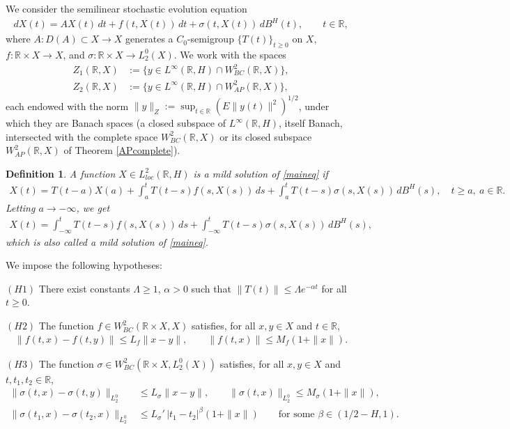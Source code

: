 \documentclass[11pt]{amsart}
\newtheorem{definition}[theorem]{Definition}
\begin{document}
We consider the semilinear stochastic evolution equation
\begin{align*}
dX(t)=AX(t)\,dt+f(t,X(t))\,dt+\sigma(t,X(t))\,dB^H(t),\qquad t\in\mathbb R,
\end{align*}
where $A:D(A)\subset X\to X$ generates a $C_0$-semigroup $\{T(t)\}_{t\ge0}$ on $X$, $f:\mathbb R\times X\to X$, and $\sigma:\mathbb R\times X\to L^0_2(X)$. We work with the spaces
\begin{align*}
Z_1(\mathbb R,X)& :=\{y\in L^\infty(\mathbb R,H)\cap W^2_{BC}(\mathbb R,X)\},\\
Z_2(\mathbb R,X)& :=\{y\in L^\infty(\mathbb R,H)\cap W^2_{AP}(\mathbb R,X)\},
\end{align*}
each endowed with the norm $\|y\|_Z:=\sup_{t\in\mathbb R}(E\|y(t)\|^2)^{1/2}$, under which they are Banach spaces (a closed subspace of $L^\infty(\mathbb R,H)$, itself Banach, intersected with the complete space $W^2_{BC}(\mathbb R,X)$ or its closed subspace $W^2_{AP}(\mathbb R,X)$ of Theorem \ref{APcomplete}).

\begin{definition}
A function $X\in L^2_{loc}(\mathbb R,H)$ is a mild solution of \eqref{maineq} if
\begin{align*}
X(t)=T(t-a)X(a)+\int_a^t T(t-s)f(s,X(s))\,ds+\int_a^t T(t-s)\sigma(s,X(s))\,dB^H(s),\quad t\ge a,\ a\in\mathbb R.
\end{align*}
Letting $a\to-\infty$, we get
\begin{align*}
X(t)=\int_{-\infty}^t T(t-s)f(s,X(s))\,ds+\int_{-\infty}^t T(t-s)\sigma(s,X(s))\,dB^H(s),
\end{align*}
which is also called a mild solution of \eqref{maineq}.
\end{definition}

We impose the following hypotheses:

$(H1)$ There exist constants $\Lambda\ge1$, $\alpha>0$ such that $\|T(t)\|\le\Lambda e^{-\alpha t}$ for all $t\ge0$.

$(H2)$ The function $f\in W^2_{BC}(\mathbb R\times X,X)$ satisfies, for all $x,y\in X$ and $t\in\mathbb R$,
\begin{align*}
\|f(t,x)-f(t,y)\|\le L_f\|x-y\|,\qquad \|f(t,x)\|\le M_f(1+\|x\|).
\end{align*}

$(H3)$ The function $\sigma\in W^2_{BC}(\mathbb R\times X,L^0_2(X))$ satisfies, for all $x,y\in X$ and $t,t_1,t_2\in\mathbb R$,
\begin{align*}
\|\sigma(t,x)-\sigma(t,y)\|_{L^0_2}&\le L_\sigma\|x-y\|,\qquad \|\sigma(t,x)\|_{L^0_2}\le M_\sigma(1+\|x\|),\\
\|\sigma(t_1,x)-\sigma(t_2,x)\|_{L^0_2}&\le L_\sigma'\,|t_1-t_2|^{\beta}(1+\|x\|)\qquad\text{for some }\beta\in\left(1/2-H,1\right).
\end{align*}
\end{document}
